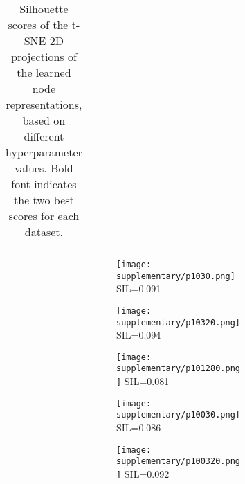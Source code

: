 \documentclass{article}
\begin{document}
\begin{table}
{\begin{tabular}{lrc rrr}
        \bottomrule
    \end{tabular}
    }
    \caption{Silhouette scores of the t-SNE 2D projections of the learned node representations, based on different hyperparameter  values. Bold font indicates the two best scores for each dataset.}
    \label{tabablation}
\end{table}

\begin{figure}
\begin{subfigure}[b]{\linewidth}
        \begin{subfigure}[b]{.46\linewidth}
        \begin{subfigure}[b]{.32\linewidth}
        \centering
        
        \texttt{[image: supplementary/p1030.png]}
        SIL=0.091
        \end{subfigure}
        \begin{subfigure}[b]{.32\linewidth}
        \centering
        
        \texttt{[image: supplementary/p10320.png]}
        SIL=0.094
        \end{subfigure}
        \begin{subfigure}[b]{.32\linewidth}
        \centering
        
        \texttt{[image: supplementary/p101280.png]}
        SIL=0.081
        \end{subfigure}
\caption{}
        \label{figpa0b10}
        \end{subfigure}
        \hfill
        \begin{subfigure}[b]{.46\linewidth}
        \begin{subfigure}[b]{.32\linewidth}
        \centering
        
        \texttt{[image: supplementary/p10030.png]}
        SIL=0.086
        \end{subfigure}
        \begin{subfigure}[b]{.32\linewidth}
        \centering
        
        \texttt{[image: supplementary/p100320.png]}
        SIL=0.092
        \end{subfigure}
        \begin{subfigure}[b]{.32\linewidth}
        \centering
        

\end{subfigure}
\end{subfigure}
\end{subfigure}
\end{figure}
\end{document}
